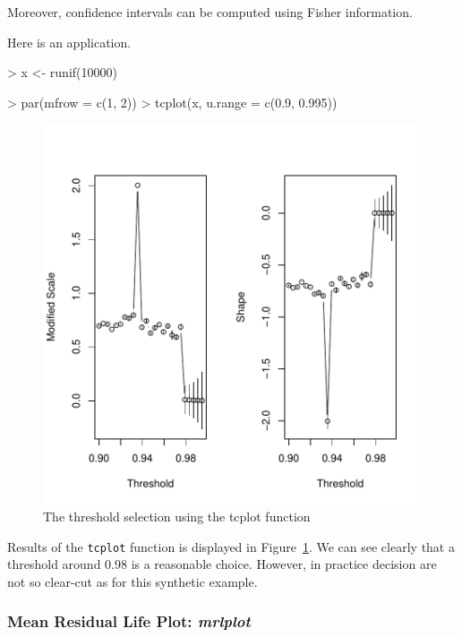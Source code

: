 \documentclass[a4paper]{article}
\numberwithin{equation}{section}
\theoremstyle{definition}
\begin{document}
Moreover, confidence intervals can be computed using Fisher
information. 

Here is an application.
\begin{Schunk}
\begin{Sinput}
> x <- runif(10000)
\end{Sinput}
\end{Schunk}

\begin{Schunk}
\begin{Sinput}
> par(mfrow = c(1, 2))
> tcplot(x, u.range = c(0.9, 0.995))
\end{Sinput}
\end{Schunk}

\begin{figure}
\begin{center}
\includegraphics{guide-004}
\end{center}
\caption{The threshold selection using the tcplot function}
\label{fig:tcplot}
\end{figure}

Results of the \verb+tcplot+ function is displayed in
Figure~\ref{fig:tcplot}. We can see clearly that a threshold around
0.98 is a reasonable choice. However, in practice decision are not so
clear-cut as for this synthetic example.


\subsubsection{Mean Residual Life Plot: \emph{mrlplot}}
\end{document}
